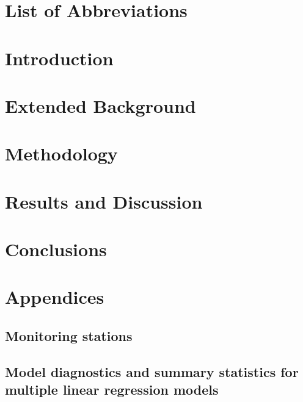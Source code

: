 \documentclass[12pt]{report}
\numberwithin{equation}{section}
\begin{document}
\listoftables
\thispagestyle{plain}

\chapter*{List of Abbreviations}


\chapter{Introduction}
\setcounter{page}{1}


\chapter{Extended Background}


\chapter{Methodology}


\chapter{Results and Discussion}


\chapter{Conclusions}


{}

%

%
\chapter*{Appendices}
\setcounter{section}{0}
\renewcommand\thesection{\Alph{section}}

\section{Monitoring stations}

\section{Model diagnostics and summary statistics for multiple linear regression models}

\end{document}
